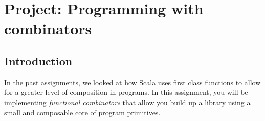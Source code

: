 \chapter{Project: Programming with combinators}

\section{Introduction}
In the past assignments, we looked at how Scala uses first class functions
to allow for a greater level of composition in programs. In this assignment,
you will be implementing \textit{functional combinators} that allow you
build up a library using a small and composable core of program primitives.
\\ \\

